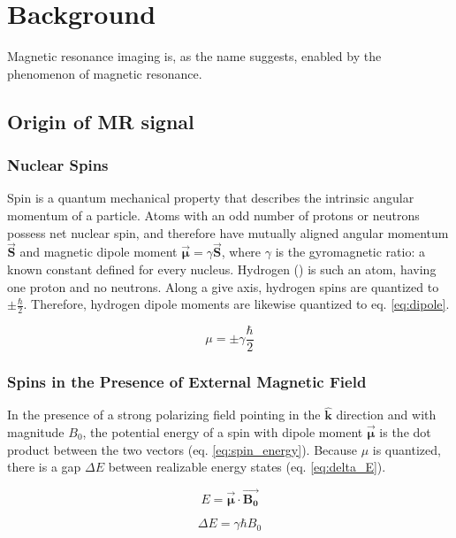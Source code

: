 \newcommand{\uvec}[1]{\bm{\hat{#1}}}
\newcommand{\bvec}[1]{\bm{\vec{#1}}}

\chapter{Background}
Magnetic resonance imaging is, as the name suggests, enabled by the phenomenon of magnetic resonance.

\section{Origin of MR signal}

\subsection{Nuclear Spins}
Spin is a quantum mechanical property that describes the intrinsic angular momentum of a particle. Atoms with an odd
number of protons or neutrons possess net nuclear spin, and therefore have mutually aligned angular momentum $\bvec{S}$
and magnetic dipole moment $\bvec{\mu}= \gamma \bvec{S}$, where $\gamma$ is the gyromagnetic ratio: a known constant
defined for every nucleus. Hydrogen () is such an atom, having one proton and no neutrons. Along a give
axis, hydrogen spins are quantized to $\pm \frac{\hbar}2$.  Therefore, hydrogen dipole moments are likewise quantized to
eq. \ref{eq:dipole}.

\begin{equation}\label{eq:dipole}
    \mu = \pm \gamma \frac{\hbar}{2}
\end{equation}

\subsection{Spins in the Presence of External Magnetic Field}
In the presence of a strong polarizing field pointing in the $\uvec{k}$ direction and with magnitude $B_0$, the
potential energy of a spin with dipole moment $\bvec{\mu}$ is the dot product between the two vectors (eq.
\ref{eq:spin_energy}). Because $\mu$ is quantized, there is a gap $\Delta E$ between realizable energy states (eq.
\ref{eq:delta_E}).

\begin{equation}\label{eq:spin_energy}
    E = \bvec{\mu} \cdot \bvec{B_0}
\end{equation}

\begin{equation}\label{eq:delta_E}
    \Delta E = \gamma \hbar B_0
\end{equation}

